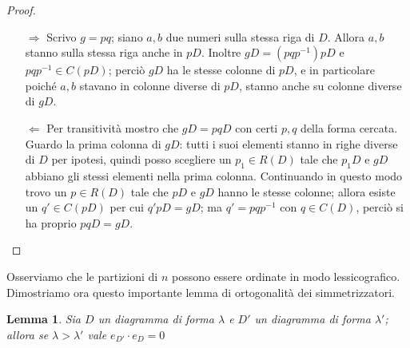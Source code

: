 \documentclass[11pt]{article}
\theoremstyle{plain}
\newtheorem{lemma}[thm]{Lemma}
\theoremstyle{definition}
\theoremstyle{remark}
\begin{document}
\begin{proof}$ $
	\begin{itemize}
		\item[$\Rightarrow$] Scrivo $g=pq$; siano $a,b$ due numeri sulla stessa riga di $D$. Allora $a,b$ stanno sulla stessa riga anche in $pD$. Inoltre $gD=(pqp^{-1})pD$ e $pqp^{-1}\in C(pD)$; perciò $gD$ ha le stesse colonne di $pD$, e in particolare poiché $a,b$ stavano in colonne diverse di $pD$, stanno anche su colonne diverse di $gD$.
		\item[$\Leftarrow$] Per transitività mostro che $gD=pqD$ con certi $p,q$ della forma cercata. Guardo la prima colonna di $gD$: tutti i suoi elementi stanno in righe diverse di $D$ per ipotesi, quindi posso scegliere un $p_1\in R(D)$ tale che $p_1D$ e $gD$ abbiano gli stessi elementi nella prima colonna. Continuando in questo modo trovo un $p\in R(D)$ tale che $pD$ e $gD$ hanno le stesse colonne; allora esiste un $q'\in C(pD)$ per cui $q'pD=gD$; ma $q'=pqp^{-1}$ con $q\in C(D)$, perciò si ha proprio $pqD=gD$.
	\end{itemize}
\end{proof}
Osserviamo che le partizioni di $n$ possono essere ordinate in modo lessicografico.\\
Dimostriamo ora questo importante lemma di ortogonalità dei simmetrizzatori.
\begin{lemma}\label{Sn:ortogonalita}
	Sia $D$ un diagramma di forma $\lambda$ e $D'$ un diagramma di forma $\lambda'$; allora se $\lambda>\lambda'$ vale $e_{D'}\cdot e_{D}=0$
\end{lemma}
\end{document}
